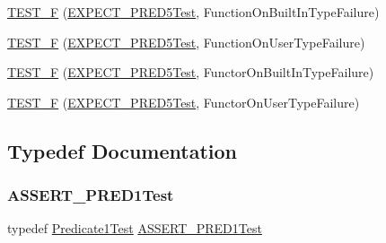 \begin{DoxyCompactItemize}
\item 
\mbox{\hyperlink{_obj__test_2lib_2googletest-master_2googletest_2test_2gtest__pred__impl__unittest_8cc_a9f91ab913ee8017bc5e837cc34e30ae8}{T\+E\+S\+T\+\_\+F}} (\mbox{\hyperlink{googletest-master_2googletest_2test_2gtest__pred__impl__unittest_8cc_a9e7ab56ee0997fdc5c9f7318d0f1094c}{E\+X\+P\+E\+C\+T\+\_\+\+P\+R\+E\+D5\+Test}}, Function\+On\+Built\+In\+Type\+Failure)
\item 
\mbox{\hyperlink{_obj__test_2lib_2googletest-master_2googletest_2test_2gtest__pred__impl__unittest_8cc_a6188c218f102846ec55e25fcd29c1e8e}{T\+E\+S\+T\+\_\+F}} (\mbox{\hyperlink{googletest-master_2googletest_2test_2gtest__pred__impl__unittest_8cc_a9e7ab56ee0997fdc5c9f7318d0f1094c}{E\+X\+P\+E\+C\+T\+\_\+\+P\+R\+E\+D5\+Test}}, Function\+On\+User\+Type\+Failure)
\item 
\mbox{\hyperlink{_obj__test_2lib_2googletest-master_2googletest_2test_2gtest__pred__impl__unittest_8cc_a7c8988c2d19eb5ed71e3bd4a0f69f96d}{T\+E\+S\+T\+\_\+F}} (\mbox{\hyperlink{googletest-master_2googletest_2test_2gtest__pred__impl__unittest_8cc_a9e7ab56ee0997fdc5c9f7318d0f1094c}{E\+X\+P\+E\+C\+T\+\_\+\+P\+R\+E\+D5\+Test}}, Functor\+On\+Built\+In\+Type\+Failure)
\item 
\mbox{\hyperlink{_obj__test_2lib_2googletest-master_2googletest_2test_2gtest__pred__impl__unittest_8cc_ada0ed61c55660de8027dfe787136c0d8}{T\+E\+S\+T\+\_\+F}} (\mbox{\hyperlink{googletest-master_2googletest_2test_2gtest__pred__impl__unittest_8cc_a9e7ab56ee0997fdc5c9f7318d0f1094c}{E\+X\+P\+E\+C\+T\+\_\+\+P\+R\+E\+D5\+Test}}, Functor\+On\+User\+Type\+Failure)
\end{DoxyCompactItemize}


\subsection{Typedef Documentation}
\mbox{\label{_obj__test_2lib_2googletest-master_2googletest_2test_2gtest__pred__impl__unittest_8cc_a14984d780d451975d1895e5de7c9dbca}} 
\subsubsection{\texorpdfstring{ASSERT\_PRED1Test}{ASSERT\_PRED1Test}}
{\footnotesize\ttfamily typedef \mbox{\hyperlink{class_predicate1_test}{Predicate1\+Test}} \mbox{\hyperlink{googletest-master_2googletest_2test_2gtest__pred__impl__unittest_8cc_a14984d780d451975d1895e5de7c9dbca}{A\+S\+S\+E\+R\+T\+\_\+\+P\+R\+E\+D1\+Test}}}

